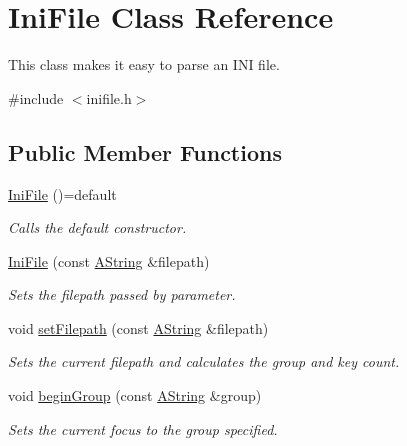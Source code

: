 \hypertarget{class_ini_file}{}\section{Ini\+File Class Reference}
\label{class_ini_file}


This class makes it easy to parse an I\+NI file.  




{\ttfamily \#include $<$inifile.\+h$>$}

\subsection*{Public Member Functions}
\begin{DoxyCompactItemize}
\item 
\mbox{\label{class_ini_file_a2f06123729cda22658a494ca61256d4a}} 
\mbox{\hyperlink{class_ini_file_a2f06123729cda22658a494ca61256d4a}{Ini\+File}} ()=default
\begin{DoxyCompactList}\small\item\em Calls the default constructor. \end{DoxyCompactList}\item 
\mbox{\hyperlink{class_ini_file_a5cc166dcb8f8584e3ad4be81efbdbda9}{Ini\+File}} (const \mbox{\hyperlink{class_a_string}{A\+String}} \&filepath)
\begin{DoxyCompactList}\small\item\em Sets the filepath passed by parameter. \end{DoxyCompactList}\item 
void \mbox{\hyperlink{class_ini_file_a3b3caa195a0be5077e8575e259ef7e53}{set\+Filepath}} (const \mbox{\hyperlink{class_a_string}{A\+String}} \&filepath)
\begin{DoxyCompactList}\small\item\em Sets the current filepath and calculates the group and key count. \end{DoxyCompactList}\item 
void \mbox{\hyperlink{class_ini_file_a9a34c2bebd5c841500a925e0df6674e9}{begin\+Group}} (const \mbox{\hyperlink{class_a_string}{A\+String}} \&group)
\begin{DoxyCompactList}\small\item\em Sets the current focus to the group specified. \end{DoxyCompactList}\item 
\mbox{\label{class_ini_file_ac01a3e9ffdf50392c12aff7b997bfbbd}} 

\end{DoxyCompactItemize}
